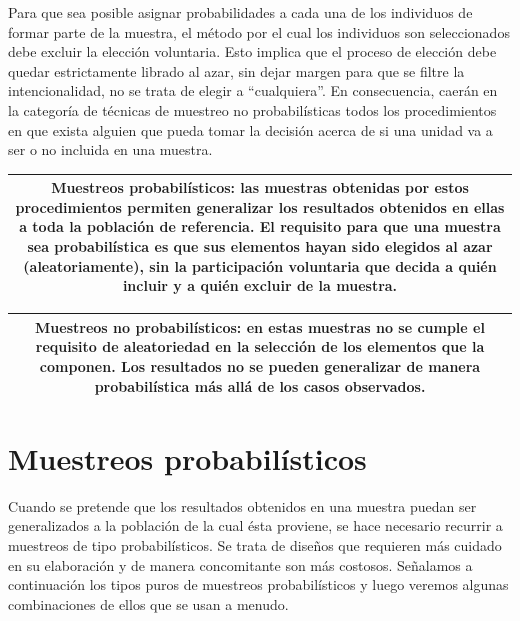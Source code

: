 \documentclass[]{book}
\begin{document}
Para que sea posible asignar probabilidades a cada una de los individuos
de formar parte de la muestra, el método por el cual los individuos son
seleccionados debe excluir la elección voluntaria. Esto implica que el
proceso de elección debe quedar estrictamente librado al azar, sin dejar
margen para que se filtre la intencionalidad, no se trata de elegir a
``cualquiera''. En consecuencia, caerán en la categoría de técnicas de
muestreo no probabilísticas todos los procedimientos en que exista
alguien que pueda tomar la decisión acerca de si una unidad va a ser o
no incluida en una muestra.

\begin{longtable}[]{@{}c@{}}
\toprule
\endhead
\begin{minipage}[t]{0.97\columnwidth}\centering
\textbf{Muestreos probabilísticos}: las muestras obtenidas por estos procedimientos permiten generalizar los resultados obtenidos en ellas a toda la población de referencia. El requisito para que una muestra sea probabilística es que sus elementos hayan sido elegidos al azar (aleatoriamente), sin la participación voluntaria que decida a quién incluir y a quién excluir de la muestra.\strut
\end{minipage}\tabularnewline
\bottomrule
\end{longtable}

\begin{longtable}[]{@{}c@{}}
\toprule
\endhead
\begin{minipage}[t]{0.97\columnwidth}\centering
\textbf{Muestreos no probabilísticos}: en estas muestras no se cumple el requisito de aleatoriedad en la selección de los elementos que la componen. Los resultados no se pueden generalizar de manera probabilística más allá de los casos observados.\strut
\end{minipage}\tabularnewline
\bottomrule
\end{longtable}

\hypertarget{muestreos-probabilisticos}{%
\section{Muestreos probabilísticos}\label{muestreos-probabilisticos}}

Cuando se pretende que los resultados obtenidos en una muestra puedan
ser generalizados a la población de la cual ésta proviene, se hace
necesario recurrir a muestreos de tipo probabilísticos. Se trata de
diseños que requieren más cuidado en su elaboración y de manera
concomitante son más costosos. Señalamos a continuación los tipos puros
de muestreos probabilísticos y luego veremos algunas combinaciones de
ellos que se usan a menudo.
\end{document}
